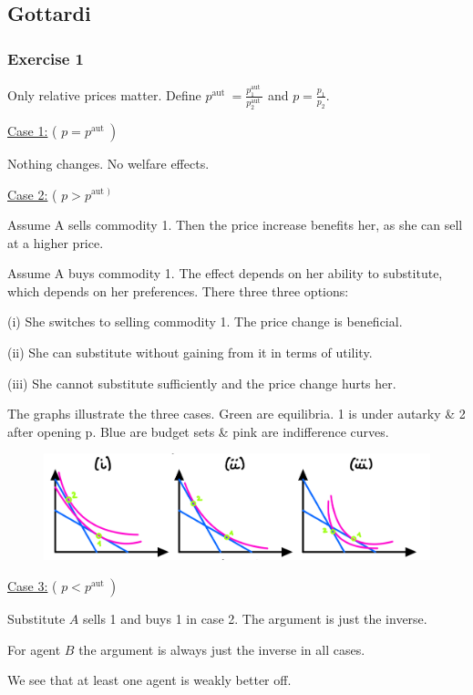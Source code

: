 \newpage
{
\subsection*{Gottardi}

\subsubsection*{Exercise 1}

Only relative prices matter. Define $p^{\text {aut }}=\frac{p_{1}^{\text {aut }}}{p_{2}^{\text {aut }}}$ and $p=\frac{p_{1}}{p_{2}}$.

\underline{Case 1:} ( $\left.p=p^{\text {aut }}\right)$

Nothing changes. No welfare effects.

\underline{Case 2:} ( $p>p^{\text {aut })}$

Assume A sells commodity 1. Then the price increase benefits her, as she can sell at a higher price.

Assume A buys commodity 1. The effect depends on her ability to substitute, which depends on her preferences. There three three options:

(i) She switches to selling commodity 1. The price change is beneficial.

(ii) She can substitute without gaining from it in terms of utility.

(iii) She cannot substitute sufficiently and the price change hurts her.

The graphs illustrate the three cases. Green are equilibria. 1 is under autarky \& 2 after opening p. Blue are budget sets \& pink are indifference curves.

\begin{figure}[!h]
    \centering
    \includegraphics[width=\textwidth]{images/2015_16_1.png}
\end{figure}

\underline{Case 3:} ( $\left.p<p^{\text {aut }}\right)$

Substitute $A$ sells 1 and buys 1 in case 2. The argument is just the inverse.

For agent $B$ the argument is always just the inverse in all cases.

We see that at least one agent is weakly better off.
}
